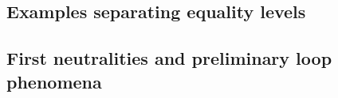 
\subsection{Examples separating equality levels}\label{subsec:appC-equality}

\subsection{First neutralities and preliminary loop phenomena}\label{subsec:appC-neutralities}
